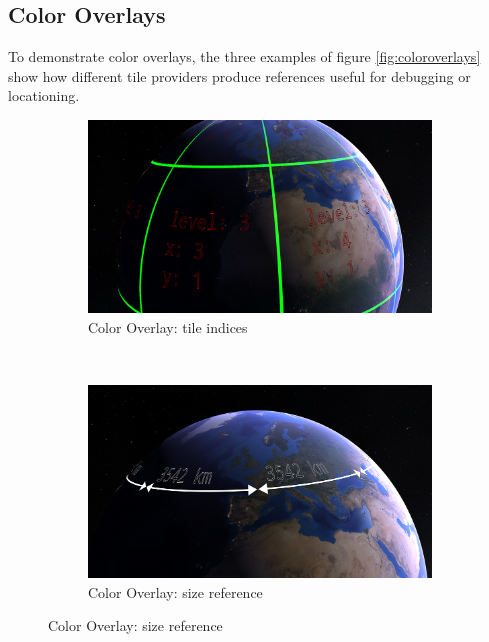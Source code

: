 \clearpage
\subsection{Color Overlays}
\FloatBarrier

To demonstrate color overlays, the three examples of figure \ref{fig:coloroverlays} show how different tile providers produce references useful for debugging or locationing. 

\begin{figure}[h]
    \centering
    \begin{subfigure}[bt]{0.45\textwidth}
        \includegraphics[width=\textwidth]{figures/results/screenshots/coloroverlay1.jpg}
        \caption{Color Overlay: tile indices}
    \end{subfigure}
    ~
    \begin{subfigure}[bt]{0.45\textwidth}
        \includegraphics[width=\textwidth]{figures/results/screenshots/coloroverlay2.jpg}
        \caption{Color Overlay: size reference}
    \end{subfigure}
    

\end{figure}
